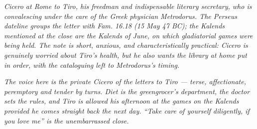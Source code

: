 
\textit{Cicero at Rome to Tiro, his freedman and indispensable
literary secretary, who is convalescing under the care of the Greek
physician Metrodorus. The Perseus dateline groups the letter with
\textit{Fam.} 16.18 (15 May 47 BC); the Kalends mentioned at the
close are the Kalends of June, on which gladiatorial games were being
held. The note is short, anxious, and characteristically practical:
Cicero is genuinely worried about Tiro's health, but he also wants
the library at home put in order, with the cataloguing left to
Metrodorus's timing.}

\textit{The voice here is the private Cicero of the letters to Tiro
--- terse, affectionate, peremptory and tender by turns. Diet is the
greengrocer's department, the doctor sets the rules, and Tiro is
allowed his afternoon at the games on the Kalends provided he comes
straight back the next day. ``Take care of yourself diligently, if
you love me'' is the unembarrassed close.}
